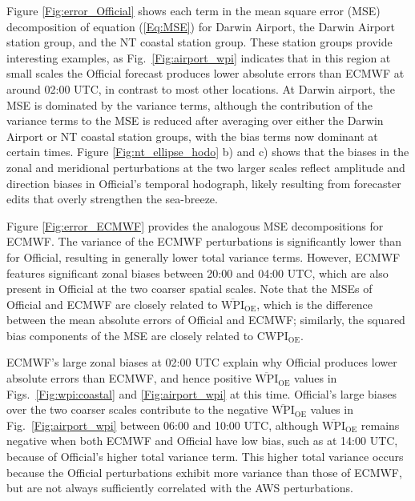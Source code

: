 \documentclass{article}
\begin{document}
Figure \ref{Fig:error_Official} shows each term in the mean square error (MSE) decomposition of equation (\ref{Eq:MSE}) for Darwin Airport, the Darwin Airport station group, and the NT coastal station group. These station groups provide interesting examples, as Fig.~\ref{Fig:airport_wpi} indicates that in this region at small scales the Official forecast produces lower absolute errors than ECMWF at around 02:00 UTC, in contrast to most other locations. At Darwin airport, the MSE is dominated by the variance terms, although the contribution of the variance terms to the MSE is reduced after averaging over either the Darwin Airport or NT coastal station groups, with the bias terms now dominant at certain times. Figure \ref{Fig:nt_ellipse_hodo} b) and c) shows that the biases in the zonal and meridional perturbations at the two larger scales reflect amplitude and direction biases in Official's temporal hodograph, likely resulting from forecaster edits that overly strengthen the sea-breeze. 

Figure \ref{Fig:error_ECMWF} provides the analogous MSE decompositions for ECMWF. The variance of the ECMWF perturbations is significantly lower than for Official, resulting in generally lower total variance terms. However, ECMWF features significant zonal biases between 20:00 and 04:00 UTC, which are also present in Official at the two coarser spatial scales. Note that the MSEs of Official and ECMWF are closely related to $\overline{\text{WPI}}_\text{OE}$, which is the difference between the mean absolute errors of Official and ECMWF; similarly, the squared bias components of the MSE are closely related to $\text{CWPI}_\text{OE}$. 

ECMWF's large zonal biases at 02:00 UTC explain why Official produces lower absolute errors than ECMWF, and hence positive $\overline{\text{WPI}}_\text{OE}$ values in Figs.~\ref{Fig:wpi:coastal} and \ref{Fig:airport_wpi} at this time. Official's large biases over the two coarser scales contribute to the negative $\overline{\text{WPI}}_\text{OE}$ values in Fig.~\ref{Fig:airport_wpi} between 06:00 and 10:00 UTC, although $\overline{\text{WPI}}_\text{OE}$ remains negative when both ECMWF and Official have low bias, such as at 14:00 UTC, because of Official's higher total variance term. This higher total variance occurs because the Official perturbations exhibit more variance than those of ECMWF, but are not always sufficiently correlated with the AWS perturbations. 
\end{document}
